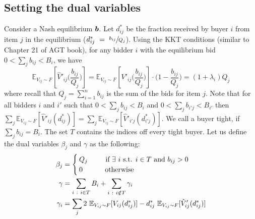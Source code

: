 \subsection{Setting the dual variables}

Consider a Nash equilibrium $\bm{b}$. Let $d_{ij}^*$ be the fraction received by buyer $i$ from item $j$ in the equilibrium ($d^{*}_{ij}~=~\sfrac{b_{ij}}{Q_j}$).
Using the KKT conditions (similar to Chapter 21 of AGT book), for any bidder $i$ with the equilibrium bid $0 < \sum_{j} b_{ij} < B_{i}$, we have
$$
\mathbb{E}_{V_{ij} \sim F}\left[\hat{V}'_{ij}\biggl( \frac{b_{ij}}{Q_j} \biggr)\right]
=  \mathbb{E}_{V_{ij} \sim F}\left[V'_{ij}\biggl( \frac{b_{ij}}{Q_j} \biggr)\right] \cdot \biggl( 1 - \frac{b_{ij}}{Q_j} \biggr)
= (1+\lambda_i) Q_j
$$
where recall that $Q_j = \sum_{i=1}^{n} b_{ij}$ is the sum of the bids for item $j$.
Note that for all bidders $i$ and $i'$ such that $0 < \sum_{j} b_{ij} < B_{i}$ and $0 < \sum_{j} b_{i'j} < B_{i'}$ then
$\sum_{j} \mathbb{E}_{V_{ij} \sim F}[\hat{V}'_{ij}(d^{*}_{ij})]  = \sum_{j} \mathbb{E}_{V_{ij} \sim F}[\hat{V}'_{i'j}(d_{i'j}^*)]$.
%
We call a buyer tight, if $\sum_{j} b_{ij} = B_i$. The set $T$ contains the indices off every tight buyer.
Let us define the dual variables $\beta_j$ and $\gamma$ as the following:
\begin{align*}
    \beta_{j} &= \begin{cases}
        Q_{j} \hspace{0.78cm} \text{ if }  \exists \ i \text{ s.t. } i \in T \text{ and } b_{ij} > 0 \\
	    0 \hspace{1cm} \text{ otherwise} \end{cases}\\
	\gamma &= \sum_{i\ :\ i \in T} B_i  + \sum_{i \ : \ i \notin T} \gamma_{i}\\
	\gamma_{i} &= \sum_{j} 2 \ \mathbb{E}_{V_{ij} \sim F}[V_{ij}(d^{*}_{ij})] - d^{*}_{ij} \ \mathbb{E}_{V_{ij} \sim F}[\hat{V}'_{ij}(d^{*}_{ij})]
\end{align*}
